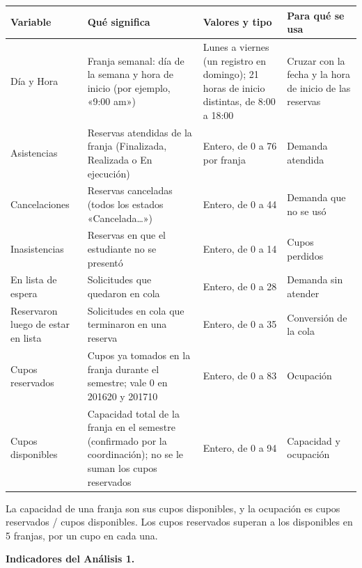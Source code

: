 \documentclass[11pt,letterpaper]{article}
\begin{document}
\begingroup\small\setlength{\tabcolsep}{4pt}\renewcommand{\arraystretch}{1.15}
\begin{longtable}{>{\raggedright\arraybackslash}p{}>{\raggedright\arraybackslash}p{}>{\raggedright\arraybackslash}p{}>{\raggedright\arraybackslash}p{}}
\toprule
\textbf{Variable} & \textbf{Qué significa} & \textbf{Valores y tipo} & \textbf{Para qué se usa} \\
\midrule
\endhead
Día y Hora & Franja semanal: día de la semana y hora de inicio (por ejemplo, «9:00 am») & Lunes a viernes (un registro en domingo); 21 horas de inicio distintas, de 8:00 a 18:00 & Cruzar con la fecha y la hora de inicio de las reservas \\
Asistencias & Reservas atendidas de la franja (Finalizada, Realizada o En ejecución) & Entero, de 0 a 76 por franja & Demanda atendida \\
Cancelaciones & Reservas canceladas (todos los estados «Cancelada\ldots{}») & Entero, de 0 a 44 & Demanda que no se usó \\
Inasistencias & Reservas en que el estudiante no se presentó & Entero, de 0 a 14 & Cupos perdidos \\
En lista de espera & Solicitudes que quedaron en cola & Entero, de 0 a 28 & Demanda sin atender \\
Reservaron luego de estar en lista & Solicitudes en cola que terminaron en una reserva & Entero, de 0 a 35 & Conversión de la cola \\
Cupos reservados & Cupos ya tomados en la franja durante el semestre; vale 0 en 201620 y 201710 & Entero, de 0 a 83 & Ocupación \\
Cupos disponibles & Capacidad total de la franja en el semestre (confirmado por la coordinación); no se le suman los cupos reservados & Entero, de 0 a 94 & Capacidad y ocupación \\
\bottomrule
\end{longtable}
\endgroup


La capacidad de una franja son sus cupos disponibles, y la ocupación es cupos reservados / cupos disponibles. Los cupos reservados superan a los disponibles en 5 franjas, por un cupo en cada una.

\textbf{Indicadores del Análisis 1.}
\end{document}
